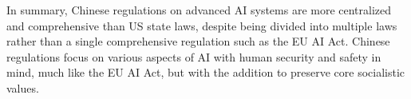 In summary, Chinese regulations on advanced AI systems are more centralized and comprehensive than US state laws, despite being divided into multiple laws rather than a single comprehensive regulation such as the EU AI Act. Chinese regulations focus on various aspects of AI with human security and safety in mind, much like the EU AI Act, but with the addition to preserve core socialistic values.
